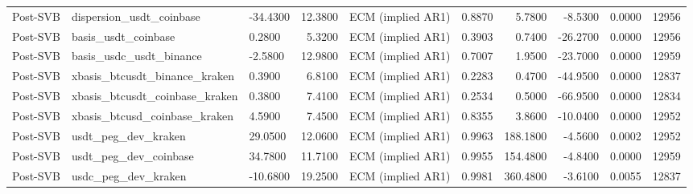 \begin{table}[H]
\begin{tabular}{lllrrrrrrl}
Post-SVB & dispersion\_usdt\_coinbase & -34.4300 & 12.3800 & ECM (implied AR1) & 0.8870 & 5.7800 & -8.5300 & 0.0000 & 12956 &  \\
Post-SVB & basis\_usdt\_coinbase & 0.2800 & 5.3200 & ECM (implied AR1) & 0.3903 & 0.7400 & -26.2700 & 0.0000 & 12956 &  \\
Post-SVB & basis\_usdc\_usdt\_binance & -2.5800 & 12.9800 & ECM (implied AR1) & 0.7007 & 1.9500 & -23.7000 & 0.0000 & 12959 &  \\
Post-SVB & xbasis\_btcusdt\_binance\_kraken & 0.3900 & 6.8100 & ECM (implied AR1) & 0.2283 & 0.4700 & -44.9500 & 0.0000 & 12837 &  \\
Post-SVB & xbasis\_btcusdt\_coinbase\_kraken & 0.3800 & 7.4100 & ECM (implied AR1) & 0.2534 & 0.5000 & -66.9500 & 0.0000 & 12834 &  \\
Post-SVB & xbasis\_btcusd\_coinbase\_kraken & 4.5900 & 7.4500 & ECM (implied AR1) & 0.8355 & 3.8600 & -10.0400 & 0.0000 & 12952 &  \\
Post-SVB & usdt\_peg\_dev\_kraken & 29.0500 & 12.0600 & ECM (implied AR1) & 0.9963 & 188.1800 & -4.5600 & 0.0002 & 12952 &  \\
Post-SVB & usdt\_peg\_dev\_coinbase & 34.7800 & 11.7100 & ECM (implied AR1) & 0.9955 & 154.4800 & -4.8400 & 0.0000 & 12959 &  \\
Post-SVB & usdc\_peg\_dev\_kraken & -10.6800 & 19.2500 & ECM (implied AR1) & 0.9981 & 360.4800 & -3.6100 & 0.0055 & 12837 &  \\
\bottomrule
\end{tabular}
\end{table}
